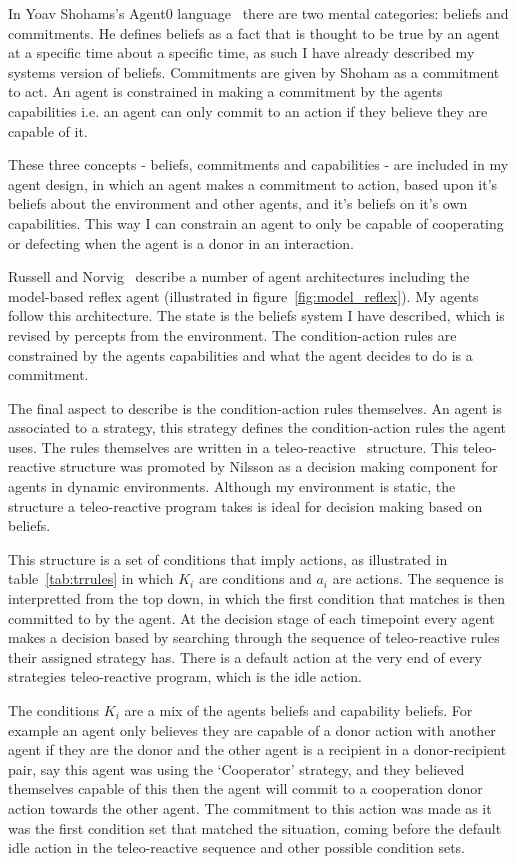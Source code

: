 \documentclass[]{final_report}
\begin{document}
In Yoav Shohams's Agent0 language~\cite{shoham1991agent0} there are two mental categories: beliefs and commitments. He defines beliefs as a fact that is thought to be true by an agent at a specific time about a specific time, as such I have already described my systems version of beliefs. Commitments are given by Shoham as a commitment to act. An agent is constrained in making a commitment by the agents capabilities i.e. an agent can only commit to an action if they believe they are capable of it.\par
These three concepts - beliefs, commitments and capabilities - are included in my agent design, in which an agent makes a commitment to action, based upon it's beliefs about the environment and other agents, and it's beliefs on it's own capabilities. This way I can constrain an agent to only be capable of cooperating or defecting when the agent is a donor in an interaction.\par
Russell and Norvig~\cite{russell2016artificial} describe a number of agent architectures including the model-based reflex agent (illustrated in figure~\ref{fig:model_reflex}). My agents follow this architecture. The state is the beliefs system I have described, which is revised by percepts from the environment. The condition-action rules are constrained by the agents capabilities and what the agent decides to do is a commitment.\par
The final aspect to describe is the condition-action rules themselves. An agent is associated to a strategy, this strategy defines the condition-action rules the agent uses. The rules themselves are written in a teleo-reactive~\cite{nilsson1993teleo} structure. This teleo-reactive structure was promoted by Nilsson as a decision making component for agents in dynamic environments. Although my environment is static, the structure a teleo-reactive program takes is ideal for decision making based on beliefs.\par
This structure is a set of conditions that imply actions, as illustrated in table~\ref{tab:trrules} in which $K_i$ are conditions and $a_i$ are actions. The sequence is interpretted from the top down, in which the first condition that matches is then committed to by the agent. At the decision stage of each timepoint every agent makes a decision based by searching through the sequence of teleo-reactive rules their assigned strategy has. There is a default action at the very end of every strategies teleo-reactive program, which is the idle action.\par
The conditions $K_i$ are a mix of the agents beliefs and capability beliefs. For example an agent only believes they are capable of a donor action with another agent if they are the donor and the other agent is a recipient in a donor-recipient pair, say this agent was using the `Cooperator' strategy, and they believed themselves capable of this then the agent will commit to a cooperation donor action towards the other agent. The commitment to this action was made as it was the first condition set that matched the situation, coming before the default idle action in the teleo-reactive sequence and other possible condition sets.\par
\end{document}
